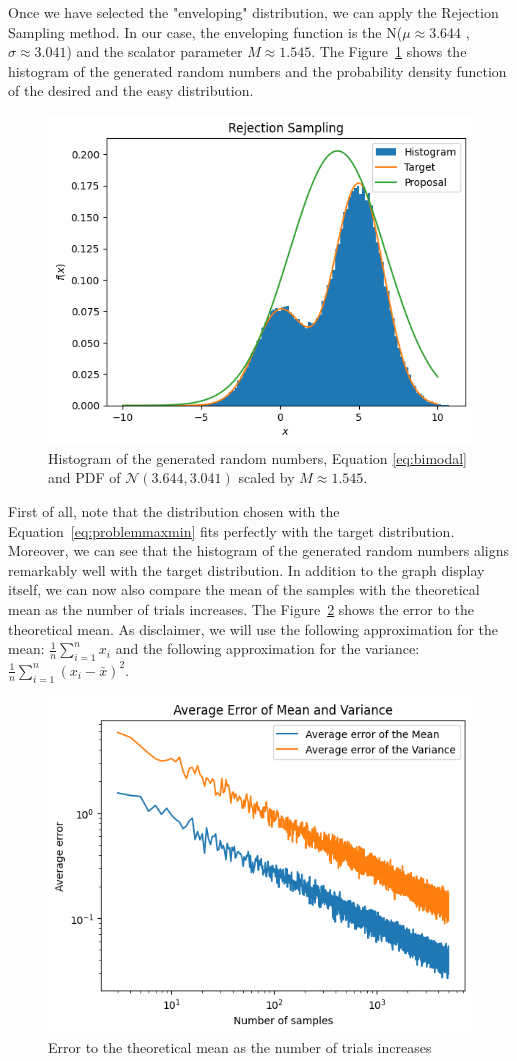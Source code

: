 \documentclass{report}
\begin{document}
Once we have selected the "enveloping" distribution, we can apply the Rejection Sampling method. In our case, the enveloping function is the N(\(\mu \approx 3.644\) ,\(\sigma \approx 3.041\)) and the scalator parameter \(M \approx 1.545\). The Figure~\ref{fig:rejectionmethod} shows the histogram of the generated random numbers and the probability density function of the desired and the easy distribution.

\begin{figure}[H]
	\centering
	\includegraphics[width=0.5\linewidth]{./Figures/AcceptanceRejection/hist.png}
	\caption{Histogram of the generated random numbers, Equation \eqref{eq:bimodal} and PDF of \(\mathcal{N}(3.644,3.041)\) scaled by \(M \approx 1.545\).}
	\label{fig:rejectionmethod}
\end{figure}

First of all, note that the distribution chosen with the Equation~\ref{eq:problemmaxmin} fits perfectly with the target distribution. Moreover, we can see that the histogram of the generated random numbers aligns remarkably well with the target distribution. In addition to the graph display itself, we can now also compare the mean of the samples with the theoretical mean as the number of trials increases. The Figure~\ref{fig:rejectionerror} shows the error to the theoretical mean. As disclaimer, we will use the following approximation for the mean: \(\frac{1}{n}\sum_{i=1}^{n} x_i\) and the following approximation for the variance: \(\frac{1}{n}\sum_{i=1}^{n} (x_i - \bar{x})^2\).

\begin{figure}[H]
	\centering
	\includegraphics[width=0.5\linewidth]{./Figures/AcceptanceRejection/error_linear_regression.png}
	\caption{Error to the theoretical mean as the number of trials increases}
	\label{fig:rejectionerror}
\end{figure}
\end{document}
